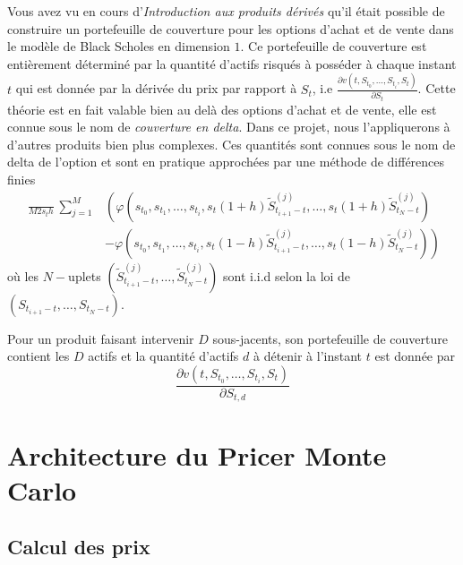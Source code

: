 \documentclass[a4paper,11pt]{article}
\def\expp#1{\mathop {\mathrm{e}^{ #1}}}
\begin{document}
Vous avez vu en cours d'{\it Introduction aux produits dérivés} qu'il était possible de construire un portefeuille de couverture pour les options d'achat et de vente dans le modèle de Black Scholes en dimension $1$. Ce portefeuille de couverture est entièrement déterminé par la quantité d'actifs risqués à posséder à chaque instant $t$ qui est donnée par la dérivée du prix par rapport à $S_t$, i.e $\frac{\partial v(t, S_{t_0}, \dots, S_{t_i}, S_{t})}{\partial S_t}$.  Cette théorie est en fait valable bien au delà des options d'achat et de vente, elle est connue sous le nom de {\it couverture en delta}. Dans ce projet, nous l'appliquerons à d'autres produits bien plus complexes.  Ces quantités sont connues sous le nom de delta de l'option et sont en pratique approchées par une méthode de différences finies
\begin{align}
  \label{delta_t}
  \frac{\expp{-r (T - t)}}{M  2 s_t h} \sum_{j=1}^M & \left( \varphi(s_{t_0}, s_{t_1}, \dots,
  s_{t_i}, s_t(1+h) \tilde S_{t_{i+1} - t}^{(j)}, \dots,  s_t(1+h) \tilde S_{t_N -
  t}^{(j)}) \right. \nonumber \\
  & \left. - \varphi(s_{t_0}, s_{t_1}, \dots,
  s_{t_i}, s_t(1-h) \tilde S_{t_{i+1} - t}^{(j)}, \dots,  s_t (1-h) \tilde
  S_{t_N - t}^{(j)}) \right)
\end{align}
où les $N-$uplets $(\tilde S_{t_{i+1} - t}^{(j)}, \dots, \tilde S_{t_N -
t}^{(j)})$ sont i.i.d selon la loi de $(S_{t_{i+1} - t}, \dots, S_{t_N - t})$.

Pour un produit faisant intervenir $D$ sous-jacents, son portefeuille de couverture contient les $D$ actifs et la quantité d'actifs $d$ à détenir à l'instant $t$ est donnée par
\begin{equation*}
  \frac{\partial v(t, S_{t_0}, \dots, S_{t_i}, S_{t})}{\partial S_{t,d}}
\end{equation*}

\section{Architecture du Pricer Monte Carlo}
\label{sec:archi}
\subsection{Calcul des prix}

\end{document}
